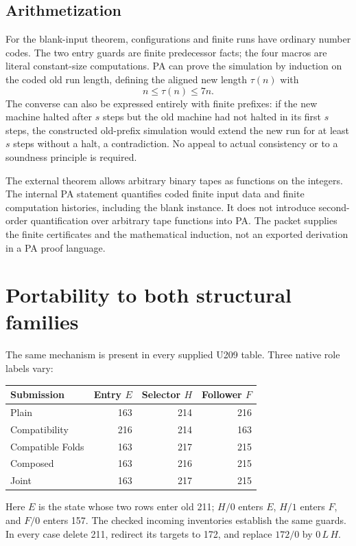 \documentclass[11pt,letterpaper]{article}
\newcommand{\act}[3]{#1\,#2\,#3}
\begin{document}
\subsection{Arithmetization}
For the blank-input theorem, configurations and finite runs have ordinary
number codes. The two entry guards are finite predecessor facts; the four
macros are literal constant-size computations. PA can prove the simulation
by induction on the coded old run length, defining the aligned new length
$\tau(n)$ with
\[
                     n\le\tau(n)\le7n.
\]
The converse can also be expressed entirely with finite prefixes: if the
new machine halted after $s$ steps but the old machine had not halted in its
first $s$ steps, the constructed old-prefix simulation would extend the new
run for at least $s$ steps without a halt, a contradiction. No appeal to
actual consistency or to a soundness principle is required.

The external theorem allows arbitrary binary tapes as functions on the
integers. The internal PA statement quantifies coded finite input data and
finite computation histories, including the blank instance. It does not
introduce second-order quantification over arbitrary tape functions into PA.
The packet supplies the finite certificates and the mathematical induction,
not an exported derivation in a PA proof language.

\section{Portability to both structural families}
The same mechanism is present in every supplied U209 table. Three native
role labels vary:
\begin{center}
\begin{tabular}{@{}lrrr@{}}
\toprule
Submission & Entry $E$ & Selector $H$ & Follower $F$\\
\midrule
Plain & 163 & 214 & 216\\
Compatibility & 216 & 214 & 163\\
Compatible Folds & 163 & 217 & 215\\
Composed & 163 & 216 & 215\\
Joint & 163 & 217 & 215\\
\bottomrule
\end{tabular}
\end{center}
Here $E$ is the state whose two rows enter old 211; $H/0$ enters $E$,
$H/1$ enters $F$, and $F/0$ enters 157. The checked incoming inventories
establish the same guards. In every case delete 211, redirect its targets to
172, and replace $172/0$ by $\act0L H$.
\end{document}
